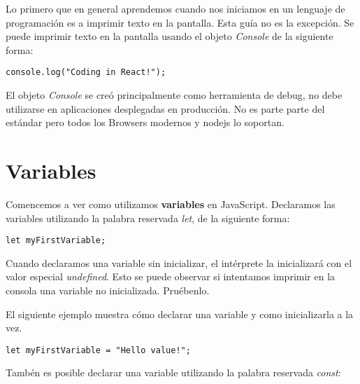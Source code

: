 \documentclass[a4paper, oneside, titlepage, 12pt]{paper}
\begin{document}
Lo primero que en general aprendemos cuando nos iniciamos en un lenguaje de programación es a imprimir texto en la pantalla. Esta guía no es la excepción. Se puede imprimir texto en la pantalla usando el objeto \textit{Console} de la siguiente forma:

\begin{verbatim}
console.log("Coding in React!");
\end{verbatim}

El objeto \textit{Console} se creó principalmente como herramienta de debug, no debe utilizarse en aplicaciones desplegadas en producción. No es parte parte del estándar pero todos los Browsers modernos y \textsf{nodejs} lo soportan.
\newline

\section{Variables}

Comencemos a ver como utilizamos \textbf{variables} en JavaScript. Declaramos las variables utilizando la palabra reservada \textit{let}, de la siguiente forma:

\begin{verbatim}
let myFirstVariable;
\end{verbatim}

Cuando declaramos una variable sin inicializar, el intérprete la inicializará con el valor especial \textit{undefined}. Esto se puede observar si intentamos imprimir en la consola una variable no inicializada. Pruébenlo. 


El siguiente ejemplo muestra cómo declarar una variable y como inicializarla a la vez.

\begin{verbatim}
let myFirstVariable = "Hello value!";
\end{verbatim}

Tambén es posible declarar una variable utilizando la palabra reservada \textit{const}:
\end{document}
